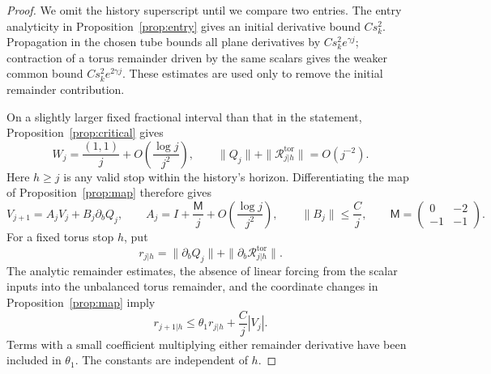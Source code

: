 \begin{proof}
We omit the history superscript until we compare two entries.  The
entry analyticity in Proposition~\ref{prop:entry} gives an initial
derivative bound \(Cs_k^2\).  Propagation in the chosen tube bounds
all plane derivatives by \(Cs_k^2e^{\gamma j}\); contraction of a
torus remainder driven by the same scalars gives the weaker common
bound \(Cs_k^2e^{2\gamma j}\).  These estimates are used only to
remove the initial remainder contribution.

On a slightly larger fixed fractional interval than that in the
statement, Proposition~\ref{prop:critical} gives
\[
 W_j=\frac{(1,1)}j+O\!\left(\frac{\log j}{j^2}\right),\qquad
 \|Q_j\|+\|\mathcal R_{j|h}^{\mathrm{tor}}\|=O(j^{-2}).
\]
Here \(h\ge j\) is any valid stop within the history's horizon.
Differentiating the map of Proposition~\ref{prop:map} therefore gives
\begin{equation}\label{eq:traj-linear-response}
 V_{j+1}=A_jV_j+B_j\partial_b Q_j,
 \qquad
 A_j=I+\frac{\mathsf M}{j}
            +O\!\left(\frac{\log j}{j^2}\right),
 \qquad \|B_j\|\le\frac Cj,
 \qquad
 \mathsf M=\begin{pmatrix}0&-2\\-1&-1\end{pmatrix}.
\end{equation}
For a fixed torus stop \(h\), put
\[
 r_{j|h}=\|\partial_bQ_j\|
                 +\|\partial_b\mathcal R_{j|h}^{\mathrm{tor}}\|.
\]
The analytic remainder estimates, the absence of linear forcing
from the scalar inputs into the unbalanced torus remainder, and the
coordinate changes in Proposition~\ref{prop:map} imply
\begin{equation}\label{eq:traj-derivative-contraction}
 r_{j+1|h}\le\theta_1r_{j|h}+\frac Cj|V_j|.
\end{equation}
Terms with a small coefficient multiplying either remainder
derivative have been included in \(\theta_1\).  The constants are
independent of \(h\).


\end{proof}
